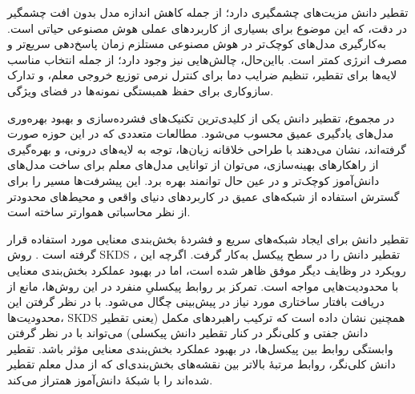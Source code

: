 تقطیر دانش مزیت‌های چشمگیری دارد؛ از جمله کاهش اندازه مدل بدون افت چشمگیر در دقت، که این موضوع برای بسیاری از کاربردهای عملی هوش مصنوعی حیاتی است. به‌کارگیری مدل‌های کوچک‌تر در هوش مصنوعی مستلزم زمان پاسخ‌دهی سریع‌تر و مصرف انرژی کمتر است. بااین‌حال، چالش‌هایی نیز وجود دارد؛ از جمله انتخاب مناسب لایه‌ها برای تقطیر، تنظیم ضرایب دما برای کنترل نرمی توزیع خروجی معلم، و تدارک سازوکاری برای حفظ همبستگی نمونه‌ها در فضای ویژگی.

در مجموع، تقطیر دانش یکی از کلیدی‌ترین تکنیک‌های فشرده‌سازی و بهبود بهره‌وری مدل‌های یادگیری عمیق محسوب می‌شود. مطالعات متعددی که در این حوزه صورت گرفته‌اند، نشان می‌دهند با طراحی خلاقانه زیان‌ها، توجه به لایه‌های درونی، و بهره‌گیری از راهکارهای بهینه‌سازی، می‌توان از توانایی مدل‌های معلم برای ساخت مدل‌های دانش‌آموز کوچک‌تر و در عین حال توانمند بهره برد. این پیشرفت‌ها مسیر را برای گسترش استفاده از شبکه‌های عمیق در کاربردهای دنیای واقعی و محیط‌های محدودتر از نظر محاسباتی هموارتر ساخته است.



تقطیر دانش برای ایجاد شبکه‌های سریع و فشردهٔ بخش‌بندی معنایی مورد استفاده قرار گرفته است \cite{heo2019comprehensiveoverhaulfeaturedistillation} \cite{yang2022crossimagerelationalknowledgedistillation}. روش SKDS \cite{Liu_2019_CVPR}، تقطیر دانش را در سطح پیکسل به‌کار گرفت. اگرچه این رویکرد در وظایف دیگر موفق ظاهر شده است، اما در بهبود عملکرد بخش‌بندی معنایی با محدودیت‌هایی مواجه است. تمرکز بر روابط پیکسلیِ منفرد در این روش‌ها، مانع از دریافت بافتار ساختاری مورد نیاز در پیش‌بینی چگال می‌شود. با در نظر گرفتن این محدودیت‌ها، SKDS همچنین نشان داده است که ترکیب راهبردهای مکمل (یعنی تقطیر دانش جفتی و کلی‌نگر در کنار تقطیر دانش پیکسلی) می‌تواند با در نظر گرفتن وابستگی روابط بین پیکسل‌ها، در بهبود عملکرد بخش‌بندی معنایی مؤثر باشد. تقطیر دانش کلی‌نگر، روابط مرتبهٔ بالاتر بین نقشه‌های بخش‌بندی‌ای که از مدل معلم تقطیر شده‌اند را با شبکهٔ دانش‌آموز همتراز می‌کند.

